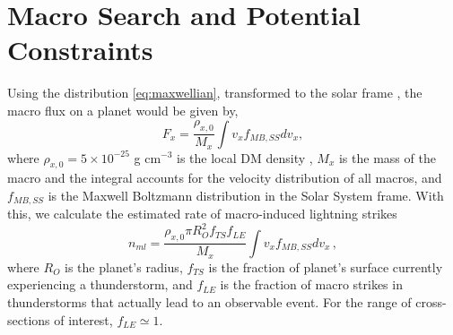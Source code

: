 \documentclass[%
 reprint,
 amsmath,amssymb,
 aps,
]{revtex4-2}
\newcommand{\vtwo}[1]{{\color{red} #1}}
\begin{document}



\section{Macro Search and Potential Constraints}  %
\label{sec:macro_search_and_constraints}

    Using the distribution \eqref{eq:maxwellian}, transformed to the solar frame \vtwo{\citep{Freese2013}}, the macro flux on a planet would be given by,
    \begin{equation}\label{eq:planet_macro_flux}
        F_{x} = \frac{\rho_{x,0}}{M_{x}} \int v_{x} f_{MB,SS} dv_x,
    \end{equation}
    where $\rho_{x,0} = 5 \times 10^{-25}$ g cm$^{-3}$ is the local DM density \vtwo{\citep{Bovy2012}}, $M_{x}$ is the mass of the macro and the integral accounts for the velocity distribution of all macros, and $f_{MB,SS}$ is the Maxwell Boltzmann distribution in the Solar System frame. With this, we calculate the estimated rate of macro-induced lightning strikes
    \begin{equation}\label{eq:macro_lightning_rate}
        n_{ml} = \frac{\rho_{x,0} \pi R_{O}^2 f_{TS} f_{LE}}{M_{x}}\int v_{x} f_{MB,SS} dv_x\,,
    \end{equation}
    where $R_{O}$ is the planet's radius, $f_{TS}$ is the fraction of planet's surface currently experiencing a thunderstorm, and $f_{LE}$ is the fraction of macro strikes in thunderstorms that actually lead to an observable event. For the range of cross-sections of interest, $f_{LE}\simeq1$.
\end{document}
